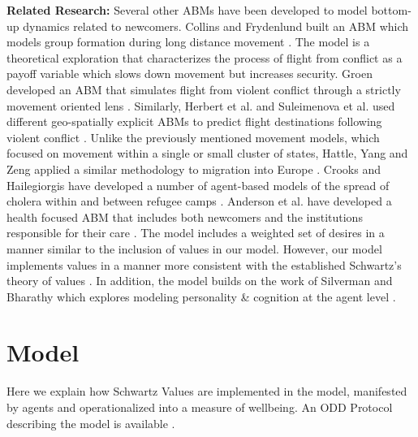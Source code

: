 \documentclass{scspaperproc}
\theoremstyle{scsthe}
\begin{document}
{\bf Related Research:} Several other ABMs have been developed to model bottom-up dynamics related to newcomers. Collins and Frydenlund built an ABM which models group formation during long distance movement \cite{22}. The model is a theoretical exploration that characterizes the process of flight from conflict as a payoff variable which slows down movement but increases security. Groen developed an ABM that simulates flight from violent conflict through a strictly movement oriented lens \cite{37}. Similarly, Herbert et al. and Suleimenova et al. used different geo-spatially explicit ABMs to predict flight destinations following violent conflict \cite{43,suleimenova2017generalized}. Unlike the previously mentioned movement models, which focused on movement within a single or small cluster of states, Hattle, Yang and Zeng applied a similar methodology to migration into Europe \cite{42}. Crooks and Hailegiorgis have developed a number of agent-based models of the spread of cholera within and between refugee camps \cite{28,38}. Anderson et al. have developed a health focused ABM that includes both newcomers and the institutions responsible for their care \cite{4}. The model includes a weighted set of desires in a manner similar to the inclusion of values in our model. However, our model implements values in a manner more consistent with the established Schwartz's theory of values \cite{phil.masters.thesis}. In addition, the model builds on the work of Silverman and Bharathy which explores modeling personality \& cognition at the agent level \cite{silverman2005modeling}.

\section{Model}

Here we explain how Schwartz Values are implemented in the model, manifested by agents and operationalized into a measure of wellbeing. An ODD Protocol describing the model is available \cite{phil.masters.thesis}.
\end{document}
